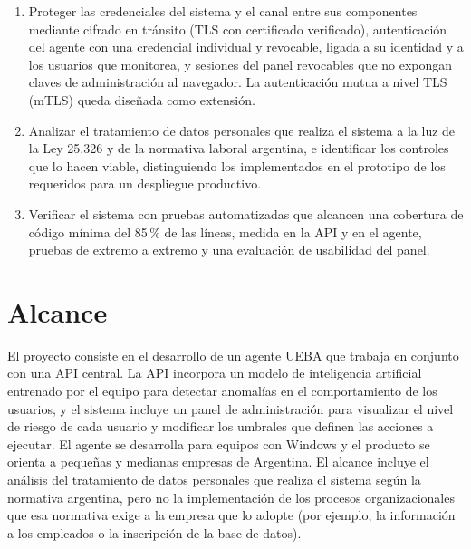 \begin{enumerate}
  \item Proteger las credenciales del sistema y el canal entre sus componentes mediante cifrado en
        tránsito (TLS con certificado verificado), autenticación del agente con una credencial
        individual y revocable, ligada a su identidad y a los usuarios que monitorea, y sesiones del panel
        revocables que no expongan claves de administración al navegador. La autenticación mutua a
        nivel TLS (mTLS) queda diseñada como extensión.
  \item Analizar el tratamiento de datos personales que realiza el sistema a la luz de la Ley 25.326
        y de la normativa laboral argentina, e identificar los controles que lo hacen viable,
        distinguiendo los implementados en el prototipo de los requeridos para un despliegue
        productivo.
  \item Verificar el sistema con pruebas automatizadas que alcancen una cobertura de código mínima
        del 85\,\% de las líneas, medida en la API y en el agente, pruebas de extremo a extremo y una
        evaluación de usabilidad del panel.
\end{enumerate}

\section{Alcance}
El proyecto consiste en el desarrollo de un agente UEBA que trabaja en conjunto con una API central.
La API incorpora un modelo de inteligencia artificial entrenado por el equipo para detectar
anomalías en el comportamiento de los usuarios, y el sistema incluye un panel de administración
para visualizar el nivel de riesgo de cada usuario y modificar los umbrales que definen las acciones
a ejecutar. El agente se desarrolla para equipos con Windows y el producto se orienta a pequeñas y
medianas empresas de Argentina. El alcance incluye el análisis del tratamiento de datos personales
que realiza el sistema según la normativa argentina, pero no la implementación de los procesos
organizacionales que esa normativa exige a la empresa que lo adopte (por ejemplo, la información a
los empleados o la inscripción de la base de datos).

